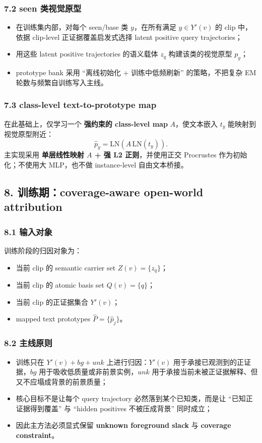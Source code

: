 \documentclass[UTF8]{ctexart}
\begin{document}
\subsubsection*{7.2 seen 类视觉原型}
\begin{itemize}
\item 在训练集内部，对每个 seen/base 类 $y$，在所有满足 $y\in Y'(v)$ 的 clip 中，依据 clip-level 正证据覆盖启发式选择 latent positive query trajectories；
\item 用这些 latent positive trajectories 的语义载体 $z_q$ 构建该类的视觉原型 $p_y$；
\item prototype bank 采用 ``离线初始化 + 训练中低频刷新'' 的策略，不把复杂 EM 轮数与频繁自训练写入主线。
\end{itemize}

\subsubsection*{7.3 class-level text-to-prototype map}
在此基础上，仅学习一个 \textbf{强约束的 class-level map} $A$，使文本嵌入 $t_y$ 能映射到视觉原型附近：
\[
\hat p_y = \mathrm{LN}(A\,\mathrm{LN}(t_y)).
\]
主实现采用 \textbf{单层线性映射 $A$ + 强 L2 正则}，并使用正交 Procrustes 作为初始化；不使用大 MLP，也不做 instance-level 自由文本桥接。

\par\noindent\hrulefill\par

\subsection*{8. 训练期：coverage-aware open-world attribution}

\subsubsection*{8.1 输入对象}
训练阶段的归因对象为：
\begin{itemize}
\item 当前 clip 的 semantic carrier set $Z(v)=\{z_q\}$；
\item 当前 clip 的 atomic basis set $Q(v)=\{q\}$；
\item 当前 clip 的正证据集合 $Y'(v)$；
\item mapped text prototypes $\hat P=\{\hat p_j\}$。
\end{itemize}

\subsubsection*{8.2 主线原则}
\begin{itemize}
\item 训练只在 \textbf{$Y'(v)+bg+unk$} 上进行归因：$Y'(v)$ 用于承接已观测到的正证据，$bg$ 用于吸收低质量或非前景实例，$unk$ 用于承接当前未被正证据解释、但又不应塌成背景的前景质量；
\item 核心目标不是让每个 query trajectory 必然落到某个已知类，而是让 ``已知正证据得到覆盖'' 与 ``hidden positives 不被压成背景'' 同时成立；
\item 因此主方法必须显式保留 \textbf{unknown foreground slack} 与 \textbf{coverage constraint}。
\end{itemize}
\end{document}
